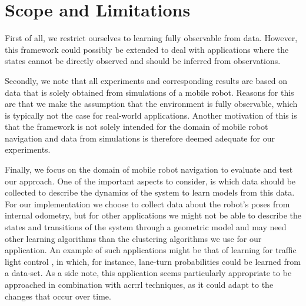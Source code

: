 \section{Scope and Limitations}
\label{sec:scope-limitations}

First of all, we restrict ourselves to learning fully observable  from data.
However, this framework could possibly be extended to deal with applications where the states cannot be directly observed and should be inferred from observations.

Secondly, we note that all experiments and corresponding results are based on data that is solely obtained from simulations of a mobile robot.
Reasons for this are that we make the assumption that the environment is fully observable, which is typically not the case for real-world applications.
Another motivation of this is that the framework is not solely intended for the domain of mobile robot navigation and data from simulations is therefore deemed adequate for our experiments. %

Finally, we focus on the domain of mobile robot navigation to evaluate and test our approach.
One of the important aspects to consider, is which data should be collected to describe the dynamics of the system to learn models from this data.
For our implementation we choose to collect data about the robot's poses from internal odometry, but for other applications we might not be able to describe the states and transitions of the system through a geometric model and may need other learning algorithms than the clustering algorithms we use for our application.
An example of such applications might be that of learning  for traffic light control \cite{wiering2004intelligent, delgado2011efficient}, in which, for instance, lane-turn probabilities could be learned from a data-set.
As a side note, this application seems particularly appropriate to be approached in combination with \acrshort{acr:rl} techniques, as it could adapt to the changes that occur over time.


